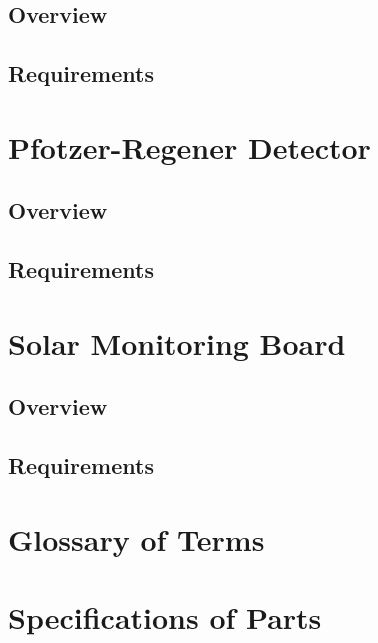 \documentclass{article}
\begin{document}
\subsection{Overview}
\subsection{Requirements}

\section{Pfotzer-Regener Detector}
\subsection{Overview}
\subsection{Requirements}

\section{Solar Monitoring Board}
\subsection{Overview}
\subsection{Requirements}

\appendix
\section{Glossary of Terms}

\section{Specifications of Parts}
\end{document}
